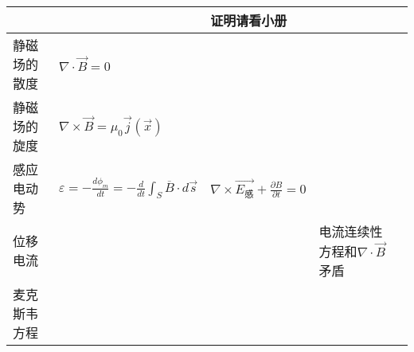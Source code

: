 \documentclass{article}
\begin{document}
\begin{table}[H]
\begin{tabular}{|m{1.5cm}<{\centering}|m{3.5cm}<{\centering}|m{3cm}<{\centering}|m{4.8cm}<{\centering}|m{1.8cm}<{\centering}|}
            &&证明请看小册\\ \hline
            静磁场的散度&$\displaystyle \nabla \cdot \vec{B}=0$&&&\\ \hline
            静磁场的旋度&$\displaystyle \nabla \times \vec{B}=\mu_0 \vec{j}(\vec{x})$&&&\\ \hline
            感应电动势&
            $\displaystyle \varepsilon=- \frac{d \phi _{m}}{dt}=- \frac{d}{dt} \int _{S}\overline{B}\cdot d \overrightarrow{s}$
            &
            $\displaystyle \nabla \times \vec{E_{\text{感}}}+\frac{\partial B}{\partial t}=0  $
            &&\\ \hline
           位移电流&&&电流连续性方程和$\nabla \cdot \vec{B}$矛盾&\\ \hline
           麦克斯韦方程&&&&\\ \hline
        \end{tabular}
        \caption{}
      \end{table}
\end{document}
